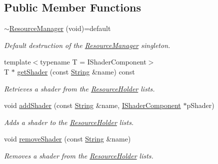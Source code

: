 \subsection*{Public Member Functions}
\begin{DoxyCompactItemize}
\item 
\hyperlink{classsparky_1_1_resource_manager_a19e493845527b32781864921284a02bb}{$\sim$\+Resource\+Manager} (void)=default\hypertarget{classsparky_1_1_resource_manager_a19e493845527b32781864921284a02bb}{}\label{classsparky_1_1_resource_manager_a19e493845527b32781864921284a02bb}

\begin{DoxyCompactList}\small\item\em Default destruction of the \hyperlink{classsparky_1_1_resource_manager}{Resource\+Manager} singleton. \end{DoxyCompactList}\item 
{\footnotesize template$<$typename T  = I\+Shader\+Component$>$ }\\T $\ast$ \hyperlink{classsparky_1_1_resource_manager_a8d48e497254410edf301df3d08248520}{get\+Shader} (const \hyperlink{classsparky_1_1_string}{String} \&name) const 
\begin{DoxyCompactList}\small\item\em Retrieves a shader from the \hyperlink{classsparky_1_1_resource_holder}{Resource\+Holder} lists. \end{DoxyCompactList}\item 
void \hyperlink{classsparky_1_1_resource_manager_aadcd7a39dafd4d1d7dcfc8c2cc2735d2}{add\+Shader} (const \hyperlink{classsparky_1_1_string}{String} \&name, \hyperlink{classsparky_1_1_i_shader_component}{I\+Shader\+Component} $\ast$p\+Shader)
\begin{DoxyCompactList}\small\item\em Adds a shader to the \hyperlink{classsparky_1_1_resource_holder}{Resource\+Holder} lists. \end{DoxyCompactList}\item 
void \hyperlink{classsparky_1_1_resource_manager_a7bb2b24c2f74a4ee23d00cf11f0fea95}{remove\+Shader} (const \hyperlink{classsparky_1_1_string}{String} \&name)
\begin{DoxyCompactList}\small\item\em Removes a shader from the \hyperlink{classsparky_1_1_resource_holder}{Resource\+Holder} lists. \end{DoxyCompactList}\end{DoxyCompactItemize}
